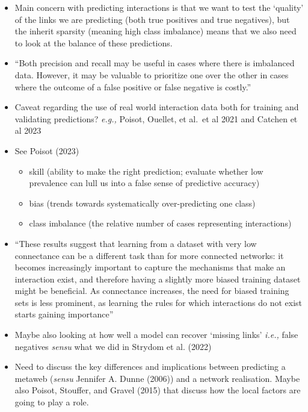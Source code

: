 \documentclass[
  letterpaper,
  DIV=11,
  numbers=noendperiod]{scrartcl}
\begin{document}
\begin{itemize}
\item
  Main concern with predicting interactions is that we want to test the
  `quality' of the links we are predicting (both true positives and true
  negatives), but the inherit sparsity (meaning high class imbalance)
  means that we also need to look at the balance of these predictions.
\item
  ``Both precision and recall may be useful in cases where there is
  imbalanced data. However, it may be valuable to prioritize one over
  the other in cases where the outcome of a false positive or false
  negative is costly.''
\item
  Caveat regarding the use of real world interaction data both for
  training and validating predictions? \emph{e.g.,} Poisot, Ouellet, et
  al.~et al 2021 and Catchen et al 2023
\item
  See Poisot (2023)

  \begin{itemize}
  \item
    skill (ability to make the right prediction; evaluate whether low
    prevalence can lull us into a false sense of predictive accuracy)
  \item
    bias (trends towards systematically over-predicting one class)
  \item
    class imbalance (the relative number of cases representing
    interactions)
  \end{itemize}
\item
  ``These results suggest that learning from a dataset with very low
  connectance can be a different task than for more connected networks:
  it becomes increasingly important to capture the mechanisms that make
  an interaction exist, and therefore having a slightly more biased
  training dataset might be beneficial. As connectance increases, the
  need for biased training sets is less prominent, as learning the rules
  for which interactions do not exist starts gaining importance''
\item
  Maybe also looking at how well a model can recover `missing links'
  \emph{i.e.,} false negatives \emph{sensu} what we did in Strydom et
  al. (2022)
\item
  Need to discuss the key differences and implications between
  predicting a metaweb (\emph{sensu} Jennifer A. Dunne (2006)) and a
  network realisation. Maybe also Poisot, Stouffer, and Gravel (2015)
  that discuss how the local factors are going to play a role.
\end{itemize}
\end{document}
